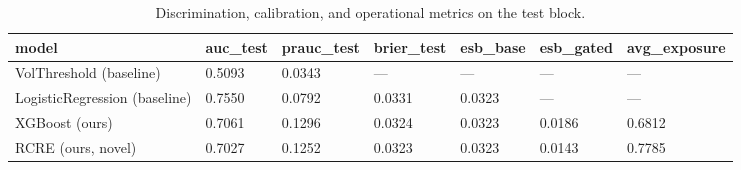 \begin{table}[t]
\centering
\small
\begin{tabular}{lllllll}
\toprule
model & auc_test & prauc_test & brier_test & esb_base & esb_gated & avg_exposure \\
\midrule
VolThreshold (baseline) & 0.5093 & 0.0343 & — & — & — & — \\
LogisticRegression (baseline) & 0.7550 & 0.0792 & 0.0331 & 0.0323 & — & — \\
XGBoost (ours) & 0.7061 & 0.1296 & 0.0324 & 0.0323 & 0.0186 & 0.6812 \\
RCRE (ours, novel) & 0.7027 & 0.1252 & 0.0323 & 0.0323 & 0.0143 & 0.7785 \\
\bottomrule
\end{tabular}
\caption{Discrimination, calibration, and operational metrics on the test block.}
\label{tab:main_results}
\end{table}
